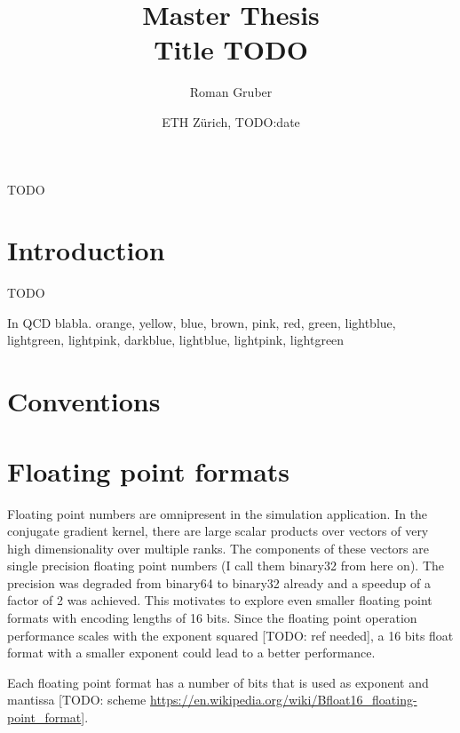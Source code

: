 \documentclass{article}
\title{Master Thesis \\ Title TODO}
\author{Roman Gruber}
\date{ETH Zürich, TODO:date}
\theoremstyle{definition}
\numberwithin{equation}{section}
\begin{document}
\maketitle

\abstract 
TODO
\newline

\doclicenseThis

\noindent\textcolor{gray}{\hrulefill}

\tableofcontents

\noindent\textcolor{gray}{\hrulefill}

\section{Introduction}

TODO

In \acrshort{QCD} blabla. \textcolor{corange}{orange}, \textcolor{cyellow}{yellow}, \textcolor{cblue}{blue}, \textcolor{cbrown}{brown}, \textcolor{cpink}{pink}, \textcolor{cred}{red}, \textcolor{cgreen}{green}, \textcolor{clightblue}{lightblue}, \textcolor{clightgreen}{lightgreen}, \textcolor{clightpink}{lightpink},  \textcolor{cdarkblue}{darkblue}, \colorbox{clightblue}{lightblue}, \colorbox{clightpink}{lightpink}, \colorbox{clightgreen}{lightgreen}

\section{Conventions}

\section{Floating point formats}
\label{sec:floats}

Floating point numbers are omnipresent in the simulation application. In the conjugate gradient kernel, there are large scalar products over vectors of very high dimensionality over multiple ranks. The components of these vectors are single precision floating point numbers (I call them \gls{binary32} from here on). The precision was degraded from \gls{binary64} to \gls{binary32} already and a speedup of a factor of 2 was achieved. This motivates to explore even smaller floating point formats with encoding lengths of 16 bits. Since the floating point operation performance scales with the exponent squared [TODO: ref needed], a 16 bits float format with a smaller exponent could lead to a better performance.

Each floating point format has a number of bits that is used as exponent and mantissa [TODO: scheme \url{https://en.wikipedia.org/wiki/Bfloat16_floating-point_format}].
\end{document}
